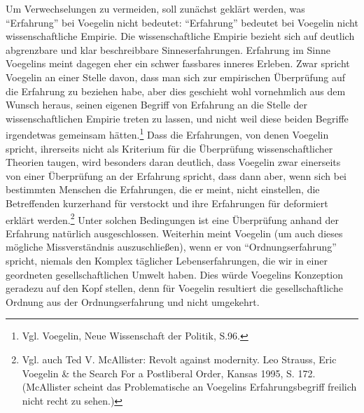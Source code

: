 Um Verwechselungen zu vermeiden, soll zunächst geklärt werden, was
"`Erfahrung"' bei Voegelin nicht bedeutet: "`Erfahrung"' bedeutet bei Voegelin
nicht wissenschaftliche Empirie. Die wissenschaftliche Empirie bezieht sich
auf deutlich abgrenzbare und klar beschreibbare Sinneserfahrungen. Erfahrung
im Sinne Voegelins meint dagegen eher ein schwer fassbares inneres Erleben.
Zwar spricht Voegelin an einer Stelle davon, dass man sich zur empirischen
Überprüfung auf die Erfahrung zu beziehen habe, aber dies geschieht wohl
vornehmlich aus dem Wunsch heraus, seinen eigenen Begriff von Erfahrung an die
Stelle der wissenschaftlichen Empirie treten zu lassen, und nicht weil diese
beiden Begriffe irgendetwas gemeinsam hätten.\footnote{Vgl. Voegelin, Neue
  Wissenschaft der Politik, S.96.} Dass die Erfahrungen, von denen Voegelin
spricht, ihrerseits nicht als Kriterium für die Überprüfung wissenschaftlicher
Theorien taugen, wird besonders daran deutlich, dass Voegelin zwar einerseits
von einer Überprüfung an der Erfahrung spricht, dass dann aber, wenn sich bei
bestimmten Menschen die Erfahrungen, die er meint, nicht einstellen, die
Betreffenden kurzerhand für verstockt und ihre Erfahrungen für deformiert
erklärt werden.\footnote{Vgl.  auch Ted V.  McAllister: Revolt against
  modernity. Leo Strauss, Eric Voegelin \& the Search For a Postliberal Order,
  Kansas 1995, S. 172.  (McAllister scheint das Problematische an Voegelins
  Erfahrungsbegriff freilich nicht recht zu sehen.)}  Unter solchen
Bedingungen ist eine Überprüfung anhand der Erfahrung natürlich
ausgeschlossen.  Weiterhin meint Voegelin (um auch dieses mögliche
Missverständnis auszuschließen), wenn er von "`Ordnungserfahrung"' spricht,
niemals den Komplex täglicher Lebenserfahrungen, die wir in einer geordneten
gesellschaftlichen Umwelt haben.  Dies würde Voegelins Konzeption geradezu auf
den Kopf stellen, denn für Voegelin resultiert die gesellschaftliche Ordnung
aus der Ordnungserfahrung und nicht umgekehrt.

